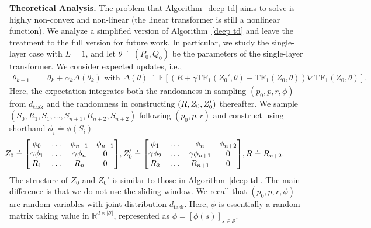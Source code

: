 \documentclass{article}
\newcommand{\fS}{\mathcal{S}}
\newcommand{\R}{\mathbb{R}}
\newcommand{\E}{\mathbb{E}}
\newcommand{\ns}{{|\fS|}}
\newcommand{\tb}[1]{{\textbf{#1}}}
\newcommand{\tf}{\text{TF}}
\begin{document}
\tb{Theoretical Analysis.}
The problem that Algorithm~\ref{deep td} aims to solve is highly non-convex and non-linear (the linear transformer is still a nonlinear function).
We analyze a simplified version of Algorithm~\ref{deep td} and leave the treatment to the full version for future work.
In particular,
we study the single-layer case with $L=1$,
and let $\theta \doteq (P_0, Q_0)$ be the parameters of the single-layer transformer.
We consider expected updates, i.e.,
\begin{align}
    \!\!\!\!\!\!\!
    \theta_{k+1} =& \theta_k + \alpha_k \Delta(\theta_k) \text{ with }
    \Delta(\theta) \doteq \E\left[(R + \gamma \tf_1(Z_0', \theta) - \tf_1(Z_0, \theta)) \nabla \tf_1(Z_0, \theta)\right]. \label{eq: expected theta update}
\end{align}
Here, the expectation integrates both the randomness in sampling $(p_0, p, r, \phi)$ from $d_\text{task}$ and the randomness in constructing $\qty(R, Z_0, Z_0')$ thereafter.
 We sample $(S_0, R_1, S_1, \dots, S_{n+1}, R_{n+2}, S_{n+2})$ following $(p_0, p, r)$ and construct using shorthand $\phi_i \doteq \phi(S_i)$
\begin{align}
\label{eq: prompt for invariant set markovian}
\!\!\!\!\!\!\!\!\!\!\!\!\!\!\!\!\!\! Z_0 \doteq \mqty[\phi_0 & \dots & \phi_{n-1} & \phi_{n+1} \\
                     \gamma \phi_1 & \dots & \gamma \phi_{n} & 0 \\
                     R_1 & \dots & R_n & 0],
    Z_0' \doteq \mqty[\phi_1 & \dots & \phi_{n} & \phi_{n+2} \\ 
                      \gamma \phi_2 & \dots & \gamma \phi_{n+1} & 0 \\ 
                      R_2 & \dots & R_{n+1} & 0], 
    R \doteq R_{n+2}.
\end{align}
The structure of $Z_0$ and $Z_0'$ is similar to those in Algorithm~\ref{deep td}. The main difference is that we do not use the sliding window.
We recall that $(p_0, p, r, \phi)$ are random variables with joint distribution $d_\text{task}$. Here, $\phi$ is essentially a random matrix taking value in $\R^{d \times \ns}$, represented as $\phi = [\phi(s)]_{s \in \fS}$.
\end{document}

